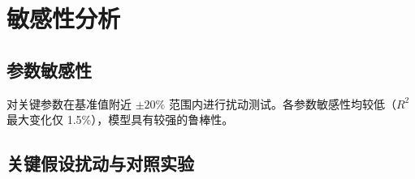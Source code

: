 \section{敏感性分析}

\subsection{参数敏感性}

对关键参数在基准值附近 $\pm 20\%$ 范围内进行扰动测试。各参数敏感性均较低（$R^2$ 最大变化仅 1.5\%），模型具有较强的鲁棒性。

\subsection{关键假设扰动与对照实验}

